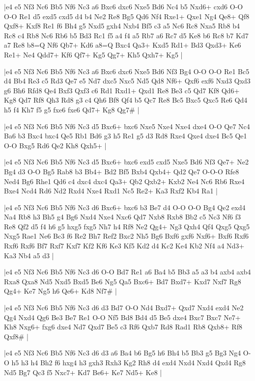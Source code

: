 \whitename{}
\blackname{}
\makegametitle
|e4 e5 Nf3 Nc6 Bb5 Nf6 Nc3 a6 Bxc6 dxc6 Nxe5 Bd6 Nc4 b5 Nxd6+ cxd6 O-O O-O Re1 d5 exd5 cxd5 d4 b4 Ne2 Re8 Bg5 Qd6 Nf4 Rxe1+ Qxe1 Ng4 Qe8+ Qf8 Qxf8+ Kxf8 Re1 f6 Bh4 g5 Nxd5 gxh4 Nxb4 Bf5 c3 a5 Nc6 Rc8 Nxa5 Rb8 b4 Rc8 c4 Rb8 Nc6 Rb6 b5 Bd3 Rc1 f5 a4 f4 a5 Rb7 a6 Rc7 d5 Ke8 b6 Rc8 b7 Kd7 a7 Re8 b8=Q Nf6 Qb7+ Kd6 a8=Q Bxc4 Qa3+ Kxd5 Rd1+ Bd3 Qxd3+ Ke6 Re1+ Ne4 Qdd7+ Kf6 Qf7+ Kg5 Qg7+ Kh5 Qxh7+ Kg5  |

\whitename{}
\blackname{}
\makegametitle
|e4 e5 Nf3 Nc6 Bb5 Nf6 Nc3 a6 Bxc6 dxc6 Nxe5 Bd6 Nf3 Bg4 O-O O-O Re1 Bc5 d4 Bb4 Re3 c5 Rd3 Qe7 e5 Nd7 dxc5 Nxc5 Nd5 Qd8 Nf6+ Qxf6 exf6 Nxd3 Qxd3 g6 Bh6 Rfd8 Qe4 Bxf3 Qxf3 c6 Rd1 Rxd1+ Qxd1 Re8 Be3 c5 Qd7 Kf8 Qd6+ Kg8 Qd7 Rf8 Qh3 Rd8 g3 c4 Qh6 Bf8 Qf4 b5 Qc7 Re8 Bc5 Bxc5 Qxc5 Re6 Qd4 h5 f4 Kh7 f5 g5 fxe6 fxe6 Qd7+ Kg8 Qg7\#  |

\whitename{}
\blackname{}
\makegametitle
|e4 e5 Nf3 Nc6 Bb5 Nf6 Nc3 d5 Bxc6+ bxc6 Nxe5 Nxe4 Nxe4 dxe4 O-O Qe7 Nc4 Ba6 b3 Bxc4 bxc4 Qe5 Rb1 Bd6 g3 h5 Re1 g5 d3 Rd8 Rxe4 Qxe4 dxe4 Bc5 Qe1 O-O Bxg5 Rd6 Qe2 Kh8 Qxh5+  |

\whitename{}
\blackname{}
\makegametitle
|e4 e5 Nf3 Nc6 Bb5 Nf6 Nc3 d5 Bxc6+ bxc6 exd5 cxd5 Nxe5 Bd6 Nf3 Qe7+ Ne2 Bg4 d3 O-O Bg5 Rab8 b3 Bb4+ Bd2 Bf5 Bxb4 Qxb4+ Qd2 Qe7 O-O-O Rfe8 Ned4 Bg6 Rhe1 Qd6 c4 dxc4 dxc4 Qa3+ Qb2 Qxb2+ Kxb2 Ne4 Nc6 Rb6 Rxe4 Bxe4 Ncd4 Rd6 Nd2 Rxd4 Nxe4 Rxd1 Nc5 Re2+ Ka3 Rxf2 Kb4 Ra1  |

\whitename{}
\blackname{}
\makegametitle
|e4 e5 Nf3 Nc6 Bb5 Nf6 Nc3 d6 Bxc6+ bxc6 b3 Be7 d4 O-O O-O Bg4 Qe2 exd4 Na4 Rb8 h3 Bh5 g4 Bg6 Nxd4 Nxe4 Nxc6 Qd7 Nxb8 Rxb8 Bb2 c5 Nc3 Nf6 f3 Re8 Qf2 d5 f4 h6 g5 hxg5 fxg5 Nh7 h4 Rf8 Ne2 Qg4+ Ng3 Qxh4 Qf4 Qxg5 Qxg5 Nxg5 Rae1 Ne6 Bc3 f6 Re2 Bh7 Ref2 Bxc2 Nh5 Bg6 Bxf6 gxf6 Nxf6+ Bxf6 Rxf6 Rxf6 Rxf6 Bf7 Rxf7 Kxf7 Kf2 Kf6 Ke3 Kf5 Kd2 d4 Kc2 Ke4 Kb2 Nf4 a4 Nd3+ Ka3 Nb4 a5 d3  |

\whitename{}
\blackname{}
\makegametitle
|e4 e5 Nf3 Nc6 Bb5 Nf6 Nc3 d6 O-O Bd7 Re1 a6 Ba4 b5 Bb3 a5 a3 b4 axb4 axb4 Rxa8 Qxa8 Nd5 Nxd5 Bxd5 Be6 Ng5 Qa5 Bxc6+ Bd7 Bxd7+ Kxd7 Nxf7 Rg8 Qg4+ Ke7 Ng5 h6 Qe6+ Kd8 Nf7\#  |

\whitename{}
\blackname{}
\makegametitle
|e4 e5 Nf3 Nc6 Bb5 Nf6 Nc3 d6 d3 Bd7 O-O Nd4 Bxd7+ Qxd7 Nxd4 exd4 Ne2 Qg4 Nxd4 Qg6 Be3 Be7 Re1 O-O Nf5 Bd8 Bd4 d5 Be5 dxe4 Bxc7 Bxc7 Ne7+ Kh8 Nxg6+ fxg6 dxe4 Nd7 Qxd7 Be5 c3 Rf6 Qxb7 Rd8 Rad1 Rb8 Qxb8+ Rf8 Qxf8\#  |

\whitename{}
\blackname{}
\makegametitle
|e4 e5 Nf3 Nc6 Bb5 Nf6 Nc3 d6 d3 a6 Ba4 b6 Bg5 h6 Bh4 b5 Bb3 g5 Bg3 Ng4 O-O h5 h3 h4 Bh2 f6 hxg4 h3 gxh3 Rxh3 Kg2 Rh8 d4 exd4 Nxd4 Nxd4 Qxd4 Rg8 Nd5 Bg7 Qc3 f5 Nxc7+ Kd7 Be6+ Ke7 Nd5+ Ke8  |

